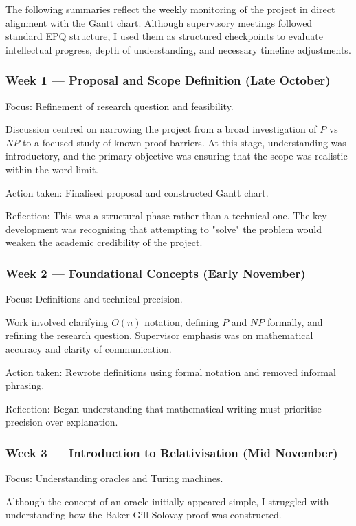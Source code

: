 \documentclass[12pt]{article}
\begin{document}
The following summaries reflect the weekly monitoring of the project in direct alignment with the Gantt chart.
Although supervisory meetings followed standard EPQ structure, I used them as structured checkpoints to evaluate intellectual progress, depth of understanding, and necessary timeline adjustments.

\subsubsection*{Week 1 --- Proposal and Scope Definition (Late October)}

Focus: Refinement of research question and feasibility.

Discussion centred on narrowing the project from a broad investigation of $P$ vs $NP$ to a focused study of known proof barriers.
At this stage, understanding was introductory, and the primary objective was ensuring that the scope was realistic within the word limit.

Action taken: Finalised proposal and constructed Gantt chart.

Reflection: This was a structural phase rather than a technical one.
The key development was recognising that attempting to "solve" the problem would weaken the academic credibility of the project.

\subsubsection*{Week 2 --- Foundational Concepts (Early November)}

Focus: Definitions and technical precision.

Work involved clarifying $O(n)$ notation, defining $P$ and $NP$ formally, and refining the research question.
Supervisor emphasis was on mathematical accuracy and clarity of communication.

Action taken: Rewrote definitions using formal notation and removed informal phrasing.

Reflection: Began understanding that mathematical writing must prioritise precision over explanation.

\subsubsection*{Week 3 --- Introduction to Relativisation (Mid November)}

Focus: Understanding oracles and Turing machines.

Although the concept of an oracle initially appeared simple, I struggled with understanding how the Baker-Gill-Solovay proof was constructed.
\end{document}
